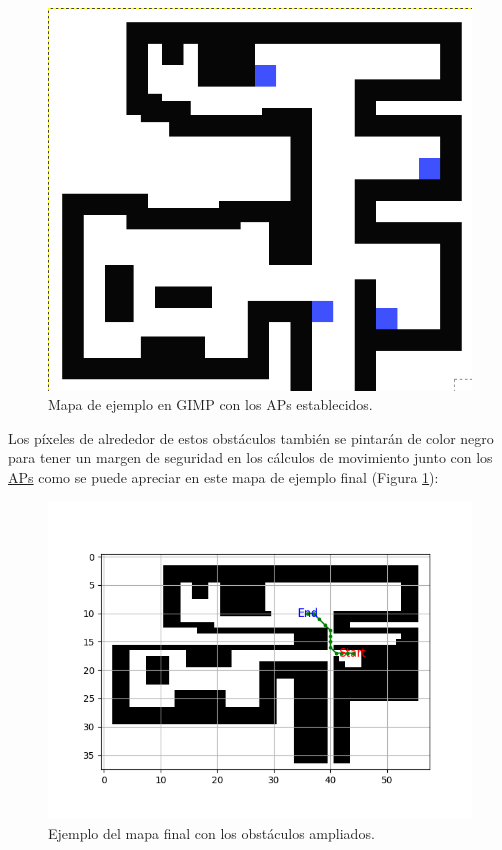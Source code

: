 \begin{figure}[H]
  \centering
  \includegraphics[scale=0.3]{figs/mapa_apes} %
  \caption{ Mapa de ejemplo en GIMP con los APs establecidos.}
  \label{fig:mapa_apes}
\end{figure}

Los píxeles de alrededor de estos obstáculos también se pintarán de color negro para tener un margen de seguridad en los cálculos de movimiento junto con los \hyperlink{APs}{APs} como se puede apreciar en este mapa de ejemplo final (Figura \ref{fig:mapa_apes}):


\begin{figure}[H]
  \centering
  \includegraphics[scale=0.8]{figs/astar} %
  \caption{ Ejemplo del mapa final con los obstáculos ampliados.}
  \label{fig:astar}
\end{figure}

